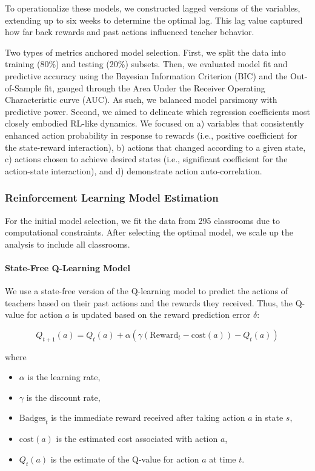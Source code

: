 \documentclass[
  number,
  preprint,
  3p,
  onecolumn]{elsarticle}
\let\oldparagraph\paragraph
\renewcommand{\paragraph}[1]{\oldparagraph{#1}\mbox{}}
\providecommand{\tightlist}{%
  \setlength{\itemsep}{0pt}\setlength{\parskip}{0pt}}\usepackage{longtable,booktabs,array}
\begin{document}
To operationalize these models, we constructed lagged versions of the
variables, extending up to six weeks to determine the optimal lag. This
lag value captured how far back rewards and past actions influenced
teacher behavior.

Two types of metrics anchored model selection. First, we split the data
into training (80\%) and testing (20\%) subsets. Then, we evaluated
model fit and predictive accuracy using the Bayesian Information
Criterion (BIC) and the Out-of-Sample fit, gauged through the Area Under
the Receiver Operating Characteristic curve (AUC). As such, we balanced
model parsimony with predictive power. Second, we aimed to delineate
which regression coefficients most closely embodied RL-like dynamics. We
focused on a) variables that consistently enhanced action probability in
response to rewards (i.e., positive coefficient for the state-reward
interaction), b) actions that changed according to a given state, c)
actions chosen to achieve desired states (i.e., significant coefficient
for the action-state interaction), and d) demonstrate action
auto-correlation.

\subsubsection{Reinforcement Learning Model
Estimation}\label{reinforcement-learning-model-estimation}

For the initial model selection, we fit the data from 295 classrooms due
to computational constraints. After selecting the optimal model, we
scale up the analysis to include all classrooms.

\paragraph{State-Free Q-Learning
Model}\label{state-free-q-learning-model}

We use a state-free version of the Q-learning model to predict the
actions of teachers based on their past actions and the rewards they
received. Thus, the Q-value for action \(a\) is updated based on the
reward prediction error \(\delta\):

\[
Q_{t+1}(a) = Q_{t}(a) + \alpha \left( \gamma (\text{Reward}_t - \text{cost}(a)) - Q_{t}(a) \right)
\]

where

\begin{itemize}
\tightlist
\item
  \(\alpha\) is the learning rate,
\item
  \(\gamma\) is the discount rate,
\item
  \(\text{Badges}_t\) is the immediate reward received after taking
  action \(a\) in state \(s\),
\item
  \(\text{cost}(a)\) is the estimated cost associated with action \(a\),
\item
  \(Q_{t}(a)\) is the estimate of the Q-value for action \(a\) at time
  \(t\).
\end{itemize}
\end{document}
